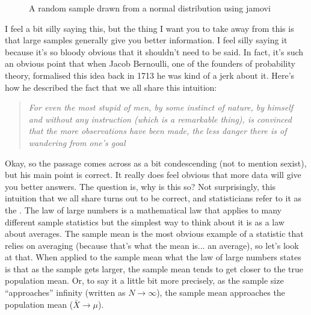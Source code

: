\begin{figure}[p]
\begin{center}
\end{center}
\caption{A random sample drawn from a normal distribution using jamovi}
\label{fig:iqsim}
\end{figure}

I feel a bit silly saying this, but the thing I want you to take away from this is that large samples generally give you better information. I feel silly saying it because it's so bloody obvious that it shouldn't need to be said. In fact, it's such an obvious point that when Jacob Bernoulli, one of the founders of probability theory, formalised this idea back in 1713 he was kind of a jerk about it. Here's how he described the fact that we all share this intuition:
\begin{quote}
{\it For even the most stupid of men, by some instinct of nature, by himself and without any instruction (which is a remarkable thing), is convinced that the more observations have been made, the less danger there is of wandering from one's goal}
\parencite[see][p.~65]{Stigler1986}
\end{quote}
Okay, so the passage comes across as a bit condescending (not to mention sexist), but his main point is correct. It really does feel obvious that more data will give you better answers. The question is, why is this so? Not surprisingly, this intuition that we all share turns out to be correct, and statisticians refer to it as the . The law of large numbers is a mathematical law that applies to many different sample statistics but the simplest way to think about it is as a law about averages. The sample mean is the most obvious example of a statistic that relies on averaging (because that's what the mean is... an average), so let's look at that. When applied to the sample mean what the law of large numbers states is that as the sample gets larger, the sample mean tends to get closer to the true population mean. Or, to say it a little bit more precisely, as the sample size ``approaches'' infinity (written as $N \rightarrow \infty$), the sample mean approaches the population mean ($\bar{X} \rightarrow \mu$). 

